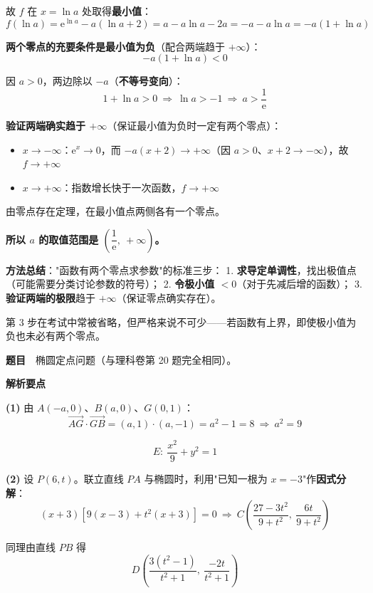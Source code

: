故 $f$ 在 $x=\ln a$ 处取得\textbf{最小值}：
\[f(\ln a)=\mathrm e^{\ln a}-a(\ln a+2)=a-a\ln a-2a=-a-a\ln a=-a\left(1+\ln a\right)\]

\textbf{两个零点的充要条件是最小值为负}（配合两端趋于 $+\infty$）：
\[-a\left(1+\ln a\right)<0\]

因 $a>0$，两边除以 $-a$（\textbf{不等号变向}）：
\[1+\ln a>0\ \Longrightarrow\ \ln a>-1\ \Longrightarrow\ a>\frac1{\mathrm e}\]

\textbf{验证两端确实趋于 $+\infty$}（保证最小值为负时一定有两个零点）：
\begin{itemize}
\item $x\to-\infty$：$\mathrm e^{x}\to0$，而 $-a(x+2)\to+\infty$（因 $a>0$、$x+2\to-\infty$），故 $f\to+\infty$ 
\item $x\to+\infty$：指数增长快于一次函数，$f\to+\infty$ 
\end{itemize}

由零点存在定理，在最小值点两侧各有一个零点。

\textbf{所以 $a$ 的取值范围是 $\left(\dfrac1{\mathrm e},\ +\infty\right)$。}

\begin{gktip}
\textbf{方法总结}："函数有两个零点求参数"的标准三步：
1. \textbf{求导定单调性}，找出极值点（可能需要分类讨论参数的符号）；
2. \textbf{令极小值 $<0$}（对于先减后增的函数）；
3. \textbf{验证两端的极限}趋于 $+\infty$（保证零点确实存在）。

第 3 步在考试中常被省略，但严格来说不可少——若函数有上界，即使极小值为负也未必有两个零点。
\end{gktip}

\par\medskip


\textbf{题目}　椭圆定点问题（与理科卷第 20 题完全相同）。

\textbf{解析要点}

\textbf{(1)} 由 $A(-a,0)$、$B(a,0)$、$G(0,1)$：
\[\overrightarrow{AG}\cdot\overrightarrow{GB}=(a,1)\cdot(a,-1)=a^{2}-1=8\ \Longrightarrow\ a^{2}=9\]

\[E:\ \frac{x^{2}}9+y^{2}=1\]

\textbf{(2)} 设 $P(6,t)$。联立直线 $PA$ 与椭圆时，利用"已知一根为 $x=-3$"作\textbf{因式分解}：
\[(x+3)\left[9(x-3)+t^{2}(x+3)\right]=0\ \Longrightarrow\ C\left(\frac{27-3t^{2}}{9+t^{2}},\ \frac{6t}{9+t^{2}}\right)\]

同理由直线 $PB$ 得
\[D\left(\frac{3\left(t^{2}-1\right)}{t^{2}+1},\ \frac{-2t}{t^{2}+1}\right)\]

